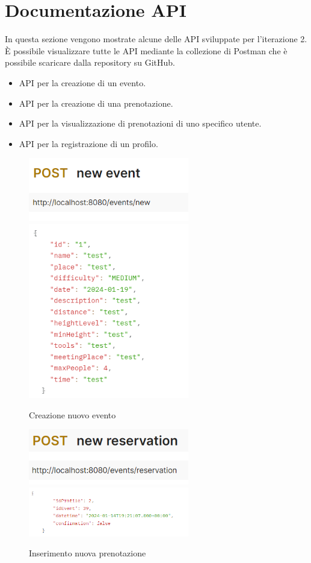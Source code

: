 \section{Documentazione API}
In questa sezione vengono mostrate alcune delle API sviluppate per l’iterazione 2. È possibile visualizzare tutte le API mediante la collezione di Postman che è possibile scaricare dalla repository su GitHub.
\begin{itemize}
    \item API per la creazione di un evento.
    \item API per la creazione di una prenotazione.
    \item API per la visualizzazione di prenotazioni di uno specifico utente.
    \item API per la registrazione di un profilo.
\end{itemize}


\newpage

\begin{figure}[h!]
\includegraphics[width=7cm]{test/postman/tnewevent.PNG}\\
\includegraphics[width=7cm]{test/postman/newevent.PNG}\\
\caption{Creazione nuovo evento}
\end{figure}

\begin{figure}[h!]
\includegraphics[width=7cm]{test/postman/tnewres.PNG}\\
\includegraphics[width=7cm]{test/postman/newres.PNG}\\
\caption{Inserimento nuova prenotazione}
\end{figure}

